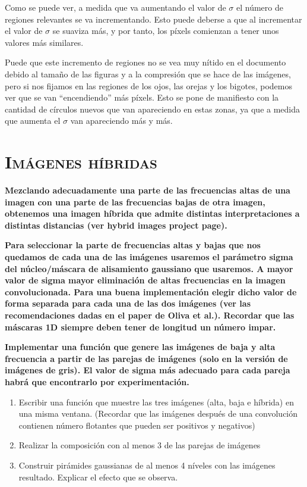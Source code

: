 \documentclass[11pt,a4paper]{article}
\begin{document}
Como se puede ver, a medida que va aumentando el valor de $\sigma$ el número de regiones relevantes se va incrementando.
Esto puede deberse a que al incrementar el valor de $\sigma$ se suaviza más, y por tanto, los píxels comienzan a tener
unos valores más similares.

Puede que este incremento de regiones no se vea muy nítido en el documento debido al tamaño de las figuras y a la compresión
que se hace de las imágenes, pero si nos fijamos en las regiones de los ojos, las orejas y los bigotes, podemos ver que se van
``encendiendo'' más píxels. Esto se pone de manifiesto con la cantidad de círculos nuevos que van apareciendo en estas zonas,
ya que a medida que aumenta el $\sigma$ van apareciendo más y más.

\newpage

\section{\textsc{Imágenes híbridas}}

\noindent \textbf{Mezclando adecuadamente una parte de las frecuencias altas de una imagen con una parte de
las frecuencias bajas de otra imagen, obtenemos una imagen híbrida que admite distintas interpretaciones a distintas
distancias (ver hybrid images project page).}

\noindent \textbf{Para seleccionar la parte de frecuencias altas y bajas que nos quedamos
de cada una de las imágenes usaremos el parámetro sigma del núcleo/máscara de alisamiento gaussiano que usaremos.
A mayor valor de sigma mayor eliminación de altas frecuencias en la imagen convolucionada. Para una buena
implementación elegir dicho valor de forma separada para cada una de las dos imágenes (ver las recomendaciones
dadas en el paper de Oliva et al.). Recordar que las máscaras 1D siempre deben tener de longitud un número impar.}

\noindent \textbf{Implementar una función que genere las imágenes de baja y alta frecuencia a partir de las
parejas de imágenes (solo en la versión de imágenes de gris). El valor de sigma más adecuado para cada pareja
habrá que encontrarlo por experimentación.}

\begin{enumerate}
	\item Escribir una función que muestre las tres imágenes (alta, baja e híbrida) en una misma ventana.
	(Recordar que las imágenes después de una convolución contienen número flotantes que pueden ser positivos y negativos)
	\item Realizar la composición con al menos 3 de las parejas de imágenes
	\item Construir pirámides gaussianas de al menos 4 níveles con las imágenes resultado. Explicar el efecto que se observa.
\end{enumerate}
\end{document}
